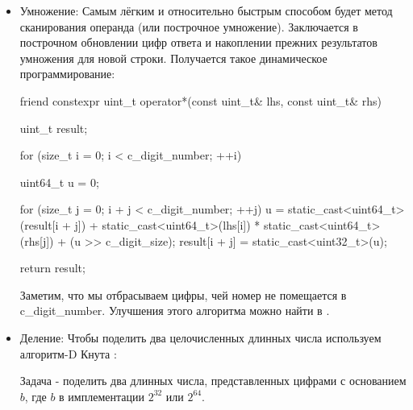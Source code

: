 \begin{itemize}
\begin{cppcode}
{    ++*this;
}
  \end{cppcode}
  Значит отрицанием будет:
  \begin{cppcode}
constexpr uint_t operator-() const {
    uint_t result = *this;
    result.negative();
    return result;
}
  \end{cppcode}
  Определяем внешние friend для вычитания:
  \begin{cppcode}
friend constexpr uint_t operator-(const uint_t& lhs, const uint_t& rhs) {
    uint_t result = lhs;
    result -= rhs;
    return result;
}

friend constexpr uint_t operator-(uint_t&& lhs, const uint_t& rhs) {
    lhs -= rhs;
    return lhs;
}

friend constexpr uint_t operator-(const uint_t& lhs, uint_t&& rhs) {
    rhs -= lhs;
    rhs.negative();
    return rhs;
}

friend constexpr uint_t operator-(uint_t&& lhs, uint_t&& rhs) {
    lhs -= rhs;
    return lhs;
}
  \end{cppcode}
  \item Умножение:
    Самым лёгким и относительно быстрым способом будет метод сканирования операнда (или построчное умножение). Заключается в построчном обновлении цифр ответа и накоплении прежних результатов умножения для новой строки. Получается такое динамическое программирование:
    \begin{cppcode}
friend constexpr uint_t operator*(const uint_t& lhs, const uint_t& rhs) {
    uint_t result;

    for (size_t i = 0; i < c_digit_number; ++i) {
        uint64_t u = 0;

        for (size_t j = 0; i + j < c_digit_number; ++j) {
            u = static_cast<uint64_t>(result[i + j])
              + static_cast<uint64_t>(lhs[i]) * static_cast<uint64_t>(rhs[j])
              + (u >> c_digit_size);
            result[i + j] = static_cast<uint32_t>(u);
        }
    }

    return result;
}
    \end{cppcode}
    Заметим, что мы отбрасываем цифры, чей номер не помещается в c\_digit\_number. Улучшения этого алгоритма можно найти в \cite{fast_mult}.
  \item Деление:
    Чтобы поделить два целочисленных длинных числа используем алгоритм-D Кнута \cite{knuth2014art}:

    Задача - поделить два длинных числа, представленных цифрами с основанием $b$, где $b$ в имплементации $2^{32}$ или $2^{64}$. 


\end{itemize}

